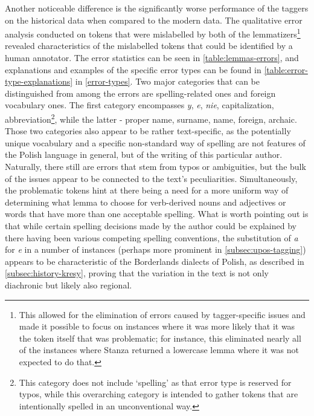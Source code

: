 Another noticeable difference is the significantly worse performance of the taggers on the historical data when compared to the modern data. The qualitative error analysis conducted on tokens that were mislabelled by both of the lemmatizers\footnote{This allowed for the elimination of errors caused by tagger-specific issues and made it possible to focus on instances where it was more likely that it was the token itself that was problematic; for instance, this eliminated nearly all of the instances where Stanza returned a lowercase lemma where it was not expected to do that.} revealed characteristics of the mislabelled tokens that could be identified by a human annotator. The error statistics can be seen in \autoref{table:lemmas-errors}, and explanations and examples of the specific error types can be found in \autoref{table:error-type-explanations} in \autoref{error-types}. Two major categories that can be distinguished from among the errors are spelling-related ones and foreign vocabulary ones. The first category encompasses \textit{y}, \textit{e}, \textit{nie}, capitalization, abbreviation\footnote{This category does not include `spelling' as that error type is reserved for typos, while this overarching category is intended to gather tokens that are intentionally spelled in an unconventional way.}, while the latter - proper name, surname, name, foreign, archaic. Those two categories also appear to be rather text-specific, as the potentially unique vocabulary and a specific non-standard way of spelling are not features of the Polish language in general, but of the writing of this particular author. Naturally, there still are errors that stem from typos or ambiguities, but the bulk of the issues appear to be connected to the text's peculiarities. Simultaneously, the problematic tokens hint at there being a need for a more uniform way of determining what lemma to choose for verb-derived nouns and adjectives or words that have more than one acceptable spelling. What is worth pointing out is that while certain spelling decisions made by the author could be explained by there having been various competing spelling conventions, the substitution of \textit{a} for \textit{e} in a number of instances (perhaps more prominent in \autoref{subsec:upos-tagging}) appears to be characteristic of the Borderlands dialects of Polish, as described in \autoref{subsec:history-kresy}, proving that the variation in the text is not only diachronic but likely also regional.

